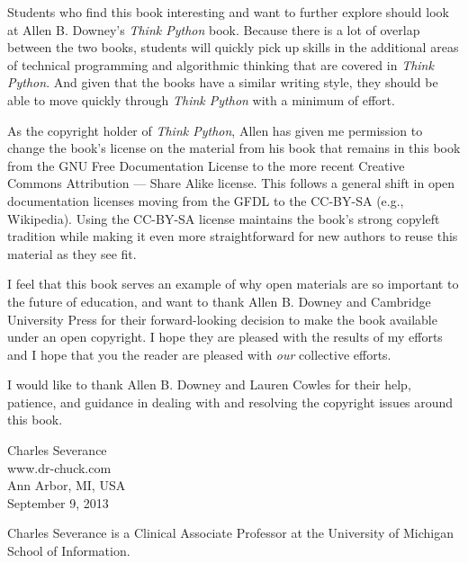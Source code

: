 Students who find this book interesting and want to further explore
should look at Allen B. Downey's \emph{Think Python} book.  Because there
is a lot of overlap between the two books,
students will quickly pick up skills in the additional
areas of technical programming and algorithmic thinking 
that are covered in \emph{Think Python}.
And given that the books have a similar writing style, they should be 
able to move quickly through \emph{Think Python} with a minimum of effort.

As the copyright holder of \emph{Think Python},
Allen has given me permission to change the book's license 
on the material from his book that remains in this book
from the
GNU Free Documentation License 
to the more recent
Creative Commons Attribution --- Share Alike
license.
This follows a general shift in open documentation licenses moving 
from the GFDL to the CC-BY-SA (e.g., Wikipedia).
Using the CC-BY-SA license maintains the book's 
strong copyleft tradition while making it even more straightforward 
for new authors to reuse this material as they see fit.

I feel that this book serves an example of why open 
materials are so important to the future of education,
and want to thank Allen B. Downey and Cambridge University
Press for their forward-looking decision to make the book available
under an open copyright.   I hope they are pleased with the 
results of my efforts and I hope that you the reader are pleased with
\emph{our} collective efforts.

I would like to thank Allen B. Downey and Lauren Cowles for their help,
patience, and guidance in dealing with and resolving the copyright 
issues around this book.

Charles Severance\\
www.dr-chuck.com\\
Ann Arbor, MI, USA\\
September 9, 2013

Charles Severance is a 
Clinical Associate Professor 
at the University of Michigan School of Information.

\clearemptydoublepage

\begin{latexonly}

\tableofcontents

\clearemptydoublepage

\end{latexonly}

\mainmatter

